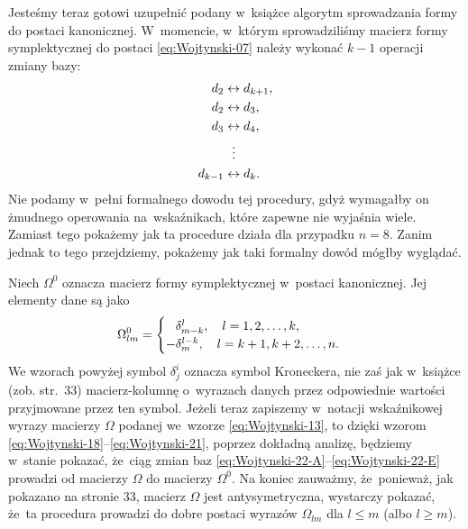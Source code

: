 \documentclass[a4paper,11pt]{article}
\begin{document}
Jesteśmy teraz gotowi uzupełnić podany w~książce algorytm sprowadzania
formy do postaci kanonicznej. W~momencie, w~którym sprowadziliśmy macierz
formy symplektycznej do postaci \eqref{eq:Wojtynski-07} należy wykonać
$k - 1$ operacji zmiany bazy:
\begin{subequations}
  \begin{align}
    \label{eq:Wojtynski-22-A}
    d_{ 2 } &\leftrightarrow d_{ k + 1 }, \\
    \label{eq:Wojtynski-22-B}
    d_{ 2 } &\leftrightarrow d_{ 3 }, \\
    \label{eq:Wojtynski-22-C}
    d_{ 3 } &\leftrightarrow d_{ 4 }, \\
    \label{eq:Wojtynski-22-D}
    &\hspace{0.65em} \vdots \\
    \label{eq:Wojtynski-22-E}
    d_{ k - 1 } &\leftrightarrow d_{ k }.
  \end{align}
\end{subequations}
Nie podamy w~pełni formalnego dowodu tej procedury, gdyż wymagałby on
żmudnego operowania na~wskaźnikach, które zapewne nie wyjaśnia wiele.
Zamiast tego pokażemy jak ta procedure działa dla przypadku $n = 8$.
Zanim jednak to tego przejdziemy, pokażemy jak taki formalny dowód mógłby
wyglądać.

Niech $\Omega^{ 0 }$ oznacza macierz formy symplektycznej w~postaci kanonicznej.
Jej elementy dane są jako
\begin{equation}
  \label{eq:Wojtynski-23}
  \Omega^{ 0 }_{ l m } =
  \begin{cases}
    \hphantom{-} \delta^{ l }_{ m - k }, \quad l = 1, 2, \ldots, k, \\
    -\delta^{ l - k }_{ m }, \quad l = k + 1, k + 2, \ldots, n.
  \end{cases}
\end{equation}
We wzorach powyżej symbol $\delta^{ i }_{ j }$ oznacza symbol Kroneckera, nie zaś
jak w~książce (zob. str.~33) macierz-kolumnę o~wyrazach danych przez
odpowiednie wartości przyjmowane przez ten symbol. Jeżeli teraz zapiszemy
w~notacji wskaźnikowej wyrazy macierzy $\Omega$ podanej we~wzorze
\eqref{eq:Wojtynski-13}, to dzięki wzorom
\eqref{eq:Wojtynski-18}--\eqref{eq:Wojtynski-21}, poprzez
dokładną analizę, będziemy w~stanie pokazać, że~ciąg zmian baz
\eqref{eq:Wojtynski-22-A}--\eqref{eq:Wojtynski-22-E} prowadzi od macierzy
$\Omega$ do macierzy $\Omega^{ 0 }$. Na koniec zauważmy, że~ponieważ, jak pokazano na
stronie 33, macierz $\Omega$ jest antysymetryczna, wystarczy pokazać, że~ta
procedura prowadzi do dobre postaci wyrazów $\Omega_{ l m }$ dla $l \leq m$ (albo
$l \geq m$).
\end{document}
